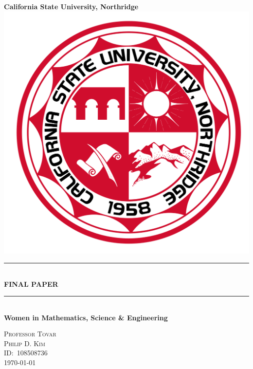 \begin{titlepage}
  \newcommand{\HRule}{\rule{\linewidth}{0.5mm}}
  \center\Huge\textbf{California State University, Northridge}\\[2cm]
  \includegraphics[scale=0.1]{images/CSUNS.svg.png}\\[1cm]
  \HRule\  \\[0.4cm]
  {\huge\bfseries FINAL PAPER}\\
  \HRule\  \\[0.4cm]
  \Large\textbf{Women in Mathematics, Science \& Engineering}\\[0.5cm]
  \vfill
  \begin{minipage}{0.4\textwidth}
  \large\centering\textsc{Professor Tovar}\\
  \textsc{Philip D. Kim}\\
  \textsc{ID:\ 108508736}\\
  \textsc{\today}
  \end{minipage}
\end{titlepage}